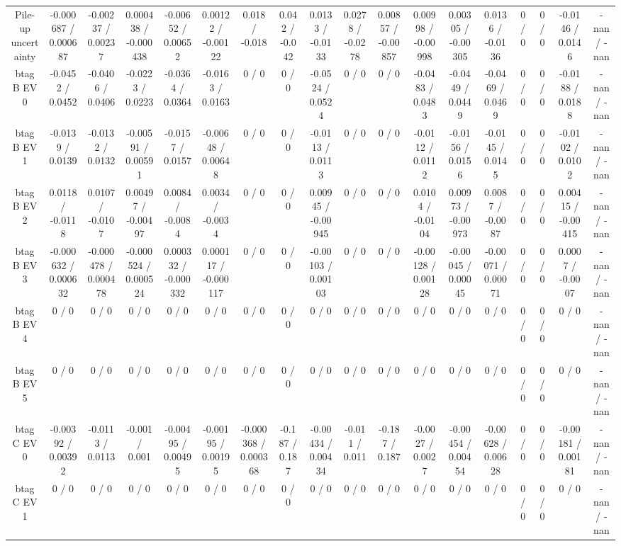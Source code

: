 \documentclass[10pt]{article}
\begin{document}
\begin{table}[htbp]
\begin{center}
\begin{tabular}{|c|c|c|c|c|c|c|c|c|c|c|c|c|c|c|c|c|c|}
  Pile-up uncertainty & -0.000687 / 0.000687 & -0.00237 / 0.00237 & 0.000438 / -0.000438 & -0.00652 / 0.00652 & 0.00122 / -0.00122 & 0.018 / -0.018 & 0.042 / -0.042 & 0.0133 / -0.0133 & 0.0278 / -0.0278 & 0.00857 / -0.00857 & 0.00998 / -0.00998 & 0.00305 / -0.00305 & 0.0136 / -0.0136 & 0 / 0 & 0 / 0 & -0.0146 / 0.0146 & -nan / -nan \\ 
  btag B EV 0 & -0.0452 / 0.0452 & -0.0406 / 0.0406 & -0.0223 / 0.0223 & -0.0364 / 0.0364 & -0.0163 / 0.0163 & 0 / 0 & 0 / 0 & -0.0524 / 0.0524 & 0 / 0 & 0 / 0 & -0.0483 / 0.0483 & -0.0449 / 0.0449 & -0.0469 / 0.0469 & 0 / 0 & 0 / 0 & -0.0188 / 0.0188 & -nan / -nan \\ 
  btag B EV 1 & -0.0139 / 0.0139 & -0.0132 / 0.0132 & -0.00591 / 0.00591 & -0.0157 / 0.0157 & -0.00648 / 0.00648 & 0 / 0 & 0 / 0 & -0.0113 / 0.0113 & 0 / 0 & 0 / 0 & -0.0112 / 0.0112 & -0.0156 / 0.0156 & -0.0145 / 0.0145 & 0 / 0 & 0 / 0 & -0.0102 / 0.0102 & -nan / -nan \\ 
  btag B EV 2 & 0.0118 / -0.0118 & 0.0107 / -0.0107 & 0.00497 / -0.00497 & 0.0084 / -0.0084 & 0.0034 / -0.0034 & 0 / 0 & 0 / 0 & 0.00945 / -0.00945 & 0 / 0 & 0 / 0 & 0.0104 / -0.0104 & 0.00973 / -0.00973 & 0.0087 / -0.0087 & 0 / 0 & 0 / 0 & 0.00415 / -0.00415 & -nan / -nan \\ 
  btag B EV 3 & -0.000632 / 0.000632 & -0.000478 / 0.000478 & -0.000524 / 0.000524 & 0.000332 / -0.000332 & 0.000117 / -0.000117 & 0 / 0 & 0 / 0 & -0.00103 / 0.00103 & 0 / 0 & 0 / 0 & -0.00128 / 0.00128 & -0.00045 / 0.00045 & -0.00071 / 0.00071 & 0 / 0 & 0 / 0 & 0.0007 / -0.0007 & -nan / -nan \\ 
  btag B EV 4 & 0 / 0 & 0 / 0 & 0 / 0 & 0 / 0 & 0 / 0 & 0 / 0 & 0 / 0 & 0 / 0 & 0 / 0 & 0 / 0 & 0 / 0 & 0 / 0 & 0 / 0 & 0 / 0 & 0 / 0 & 0 / 0 & -nan / -nan \\ 
  btag B EV 5 & 0 / 0 & 0 / 0 & 0 / 0 & 0 / 0 & 0 / 0 & 0 / 0 & 0 / 0 & 0 / 0 & 0 / 0 & 0 / 0 & 0 / 0 & 0 / 0 & 0 / 0 & 0 / 0 & 0 / 0 & 0 / 0 & -nan / -nan \\ 
  btag C EV 0 & -0.00392 / 0.00392 & -0.0113 / 0.0113 & -0.001 / 0.001 & -0.00495 / 0.00495 & -0.00195 / 0.00195 & -0.000368 / 0.000368 & -0.187 / 0.187 & -0.00434 / 0.00434 & -0.011 / 0.011 & -0.187 / 0.187 & -0.0027 / 0.0027 & -0.00454 / 0.00454 & -0.00628 / 0.00628 & 0 / 0 & 0 / 0 & -0.00181 / 0.00181 & -nan / -nan \\ 
  btag C EV 1 & 0 / 0 & 0 / 0 & 0 / 0 & 0 / 0 & 0 / 0 & 0 / 0 & 0 / 0 & 0 / 0 & 0 / 0 & 0 / 0 & 0 / 0 & 0 / 0 & 0 / 0 & 0 / 0 & 0 / 0 & 0 / 0 & -nan / -nan \\ 

\end{tabular}
\end{center}
\end{table}
\end{document}
